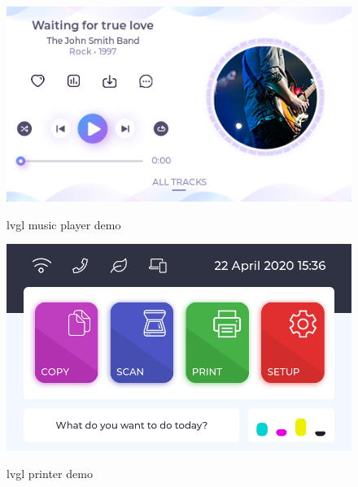 \documentclass[Bachelor, BIC, english, fhCitStyle, IEEE]{BASE/twbook} %
\begin{document}
\begin{figure}
    \caption{\ac{lvgl} music player demo \autocite{llcLiveDemosTest}}
    \centering
    \includegraphics[height=0.2\textheight]{lvgl-musicplayer-demo.png}
    \label{fig:lvgl-musicplayer-demo}
\end{figure}
\begin{figure}
    \caption{\ac{lvgl} printer demo \autocite{llcLiveDemosTest}}
    \centering
    \includegraphics[height=0.2\textheight]{lvgl-printer-demo.png}
    \label{fig:lvgl-printer-demo}
\end{figure}
\clearpage
\end{document}
